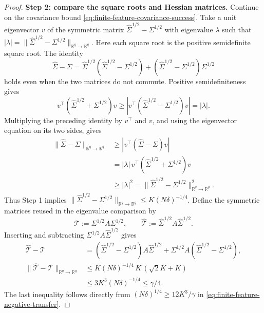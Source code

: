 \begin{proof}
\par\noindent\textbf{Step 2: compare the square roots and Hessian matrices.}
Continue on the covariance bound \eqref{eq:finite-feature-covariance-success}.
Take a unit eigenvector $v$ of the symmetric matrix
$\widehat\Sigma^{1/2}-\Sigma^{1/2}$ with eigenvalue $\lambda$ such that
$|\lambda|=\|\widehat\Sigma^{1/2}-\Sigma^{1/2}\|_{\mathbb R^q\to\mathbb R^q}$.
Here each square root is the positive semidefinite square root.
The identity
\[
 \widehat\Sigma-\Sigma
 =\widehat\Sigma^{1/2}(\widehat\Sigma^{1/2}-\Sigma^{1/2})
  +(\widehat\Sigma^{1/2}-\Sigma^{1/2})\Sigma^{1/2}
\]
holds even when the two matrices do not commute.
Positive semidefiniteness gives
\[
 v^\top(\widehat\Sigma^{1/2}+\Sigma^{1/2})v
 \ge|v^\top(\widehat\Sigma^{1/2}-\Sigma^{1/2})v|=|\lambda|.
\]
Multiplying the preceding identity by $v^\top$ and $v$, and using the
eigenvector equation on its two sides, gives
\begin{align*}
 \|\widehat\Sigma-\Sigma\|_{\mathbb R^q\to\mathbb R^q}
 &\ge|v^\top(\widehat\Sigma-\Sigma)v|\\
 &=|\lambda|\,v^\top(\widehat\Sigma^{1/2}+\Sigma^{1/2})v\\
 &\ge|\lambda|^2
   =\|\widehat\Sigma^{1/2}-\Sigma^{1/2}\|_{\mathbb R^q\to\mathbb R^q}^2.
\end{align*}
Thus Step 1 implies
$\|\widehat\Sigma^{1/2}-\Sigma^{1/2}\|_{\mathbb R^q\to\mathbb R^q}
\le K(N\delta)^{-1/4}$.
Define the symmetric matrices reused in the eigenvalue comparison by
\[
 \mathcal T:=\Sigma^{1/2}A\Sigma^{1/2},\qquad
 \widehat{\mathcal T}:=\widehat\Sigma^{1/2}A\widehat\Sigma^{1/2}.
\]
Inserting and subtracting $\Sigma^{1/2}A\widehat\Sigma^{1/2}$ gives
\begin{align*}
 \widehat{\mathcal T}-\mathcal T
 &=(\widehat\Sigma^{1/2}-\Sigma^{1/2})A\widehat\Sigma^{1/2}
       +\Sigma^{1/2}A(\widehat\Sigma^{1/2}-\Sigma^{1/2}),\\
 \|\widehat{\mathcal T}-\mathcal T\|_{\mathbb R^q\to\mathbb R^q}
 &\le K(N\delta)^{-1/4}\,K\,(\sqrt2K+K)\\
 &\le3K^3(N\delta)^{-1/4}\le\gamma/4.
\end{align*}
The last inequality follows directly from
$(N\delta)^{1/4}\ge12K^3/\gamma$ in
\eqref{eq:finite-feature-negative-transfer}.


\end{proof}
